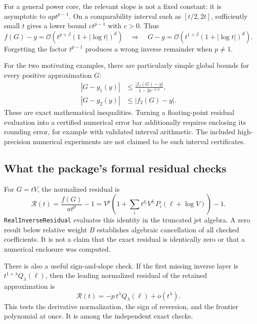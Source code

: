 \documentclass[11pt,a4paper]{article}
\numberwithin{equation}{section}
\theoremstyle{definition}\newtheorem{definition}[theorem]{Definition}
\theoremstyle{remark}\newtheorem{remark}[theorem]{Remark}
\newcommand{\OO}{\mathcal O}\newcommand{\dd}{\mathrm d}
\newcommand{\e}{\mathrm e}
\newcommand{\code}[1]{\texttt{#1}}
\begin{document}
For a general power core, the relevant slope is not a fixed constant:
it is asymptotic to $ap t^{p-1}$. On a comparability interval such as
$[t/2,2t]$, sufficiently small $t$ gives a lower bound
$c t^{p-1}$ with $c>0$. Thus
\begin{equation}
 f(G)-y=\OO(t^{p+\beta}(1+|\log t|)^d)
 \quad\Longrightarrow\quad
 G-g=\OO(t^{1+\beta}(1+|\log t|)^d).
 \label{eq:slope-transfer}
\end{equation}
Forgetting the factor $t^{p-1}$ produces a wrong inverse remainder when
$p\ne1$.

For the two motivating examples, there are particularly simple global
bounds for every positive approximation $G$:
\begin{align}
 |G-g_1(y)|&\le
 \frac{|f_1(G)-y|}{1-2\e^{-5/2}},\label{eq:log-residual-bound}\\
 |G-g_2(y)|&\le |f_2(G)-y|.
 \label{eq:pure-residual-bound}
\end{align}
These are exact mathematical inequalities. Turning a floating-point
residual evaluation into a certified numerical error bar additionally
requires enclosing its rounding error, for example with validated
interval arithmetic. The included high-precision numerical experiments
are not claimed to be such interval certificates.

\subsection{What the package's formal residual checks}

For $G=tV$, the normalized residual is
\begin{equation}
 \mathcal R(t)=\frac{f(G)}{a t^p}-1
 =V^p\left(1+\sum_i t^{\delta_i}V^{\delta_i}
                 P_i(\ell+\log V)\right)-1.
 \label{eq:normalized-residual}
\end{equation}
\code{RealInverseResidual} evaluates this identity in the truncated jet
algebra. A zero result below relative weight $B$ establishes algebraic
cancellation of all checked coefficients. It is not a claim that the
exact residual is identically zero or that a numerical enclosure was
computed.

There is also a useful sign-and-slope check. If the first missing inverse
layer is $t^{1+\lambda}Q_\lambda(\ell)$, then the leading normalized
residual of the retained approximation is
\begin{equation}
 \mathcal R(t)=-p\,t^\lambda Q_\lambda(\ell)+o(t^\lambda).
 \label{eq:frontier-residual}
\end{equation}
This tests the derivative normalization, the sign of reversion, and the
frontier polynomial at once. It is among the independent exact checks.
\end{document}
